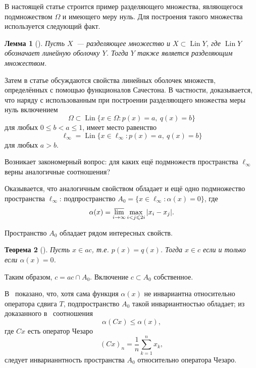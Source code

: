 \documentclass[a4paper,14pt]{article} %
\theoremstyle{plain}
\newtheorem{lemma}{Лемма}[section]
\newtheorem{theorem}[lemma]{Теорема}
\begin{document}
В настоящей статье строится пример разделяющего множества,
являющегося подмножеством $\Omega$ и имеющего меру нуль.
Для построения такого множества используется следующий факт.

\begin{lemma}[{\cite[\S 3, замечание 6]{Semenov2014geomprops}}]
	Пусть $X$~--- разделяющее множество и $X \subset \operatorname{Lin} Y$,
	где $\operatorname{Lin} Y$ обозначает линейную оболочку $Y$.
	Тогда $Y$ также является разделяющим множеством.
\end{lemma}

Затем в статье обсуждаются свойства линейных оболочек множеств, определённых с помощью функционалов Сачестона.
В частности, доказывается,
что наряду с использованным при построении разделяющего множества меры нуль включением
\begin{equation}
	\Omega \subset \operatorname{Lin}\{x\in\Omega : p(x) = a,~ q(x) = b\}
\end{equation}
для любых $0\leq b < a \leq 1$,
имеет место равенство
\begin{equation}
	\ell_\infty = \operatorname{Lin}\{x\in\ell_\infty : p(x) = a,~ q(x) = b\}
\end{equation}
для любых $a>b$.

Возникает закономерный вопрос: для каких ещё подмножеств пространства $\ell_\infty$
верны аналогичные соотношения?

Оказывается, что аналогичным свойством обладает и ещё одно подмножество пространства $\ell_\infty$: подпространство
$A_0 = \{ x \in \ell_\infty : \alpha(x) =0 \}$,
где~\cite{our-vzms-2018}
\begin{equation*}
	\alpha(x) = \varlimsup_{i\to\infty} \max_{i<j\leqslant 2i} |x_i - x_j|
	.
\end{equation*}

Пространство $A_0$ обладает рядом интересных свойств.


\begin{theorem}[{\cite[следствие 2]{our-mz2019ac0}}]
	\label{thm:alpha_c_ac_c}
	Пусть $x\in ac$, т.е. $p(x) = q(x)$.
	Тогда $x\in c$ если и только если $\alpha(x) = 0$.
\end{theorem}
Таким образом, $c = ac \cap A_0$.
Включение $c\subset A_0$ собственное.

В~\cite{our-ped-2018-alpha-Tx} показано, что, хотя сама функция $\alpha(x)$ не инвариантна относительно оператора сдвига $T$,
подпространство $A_0$ такой инвариантностью обладает;
из доказанного в~\cite{SSUZ2} соотношения
\begin{equation}
	\alpha(Cx) \leq \alpha(x)
	,
\end{equation}
где $Cx$ есть оператор Чезаро
\begin{equation}
	(Cx)_n = \frac{1}{n} \sum_{k=1}^n x_k
	,
\end{equation}
следует инварианнтность пространства $A_0$ относительно оператора Чезаро.
\end{document}

